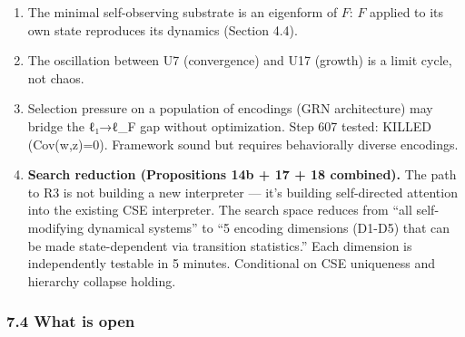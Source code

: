 \documentclass[
  11pt,
]{article}
\providecommand{\tightlist}{%
  \setlength{\itemsep}{0pt}\setlength{\parskip}{0pt}}
\begin{document}
\begin{enumerate}
\def\labelenumi{\arabic{enumi}.}
\setcounter{enumi}{11}
\tightlist
\item
  The minimal self-observing substrate is an eigenform of \(F\): \(F\)
  applied to its own state reproduces its dynamics (Section 4.4).
\item
  The oscillation between U7 (convergence) and U17 (growth) is a limit
  cycle, not chaos.
\item
  Selection pressure on a population of encodings (GRN architecture) may
  bridge the ℓ₁→ℓ\_F gap without optimization. Step 607 tested: KILLED
  (Cov(w,z)=0). Framework sound but requires behaviorally diverse
  encodings.
\item
  \textbf{Search reduction (Propositions 14b + 17 + 18 combined).} The
  path to R3 is not building a new interpreter --- it's building
  self-directed attention into the existing CSE interpreter. The search
  space reduces from ``all self-modifying dynamical systems'' to ``5
  encoding dimensions (D1-D5) that can be made state-dependent via
  transition statistics.'' Each dimension is independently testable in 5
  minutes. Conditional on CSE uniqueness and hierarchy collapse holding.
\end{enumerate}

\subsubsection{7.4 What is open}\label{what-is-open}
\end{document}
